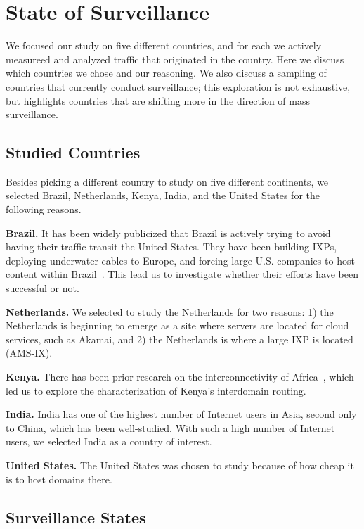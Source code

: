 \section{State of Surveillance}
\label{surv}
We focused our study on five different countries, and for each we actively measureed and analyzed traffic that originated in the country.  Here we discuss which countries we chose and our reasoning.  We also discuss a sampling of countries that currently conduct surveillance; this exploration is not exhaustive, but highlights countries that are shifting more in the direction of mass surveillance.  

\subsection{Studied Countries}
Besides picking a different country to study on five different continents, we selected Brazil, Netherlands, Kenya, India, and the United States for the following reasons.

{\bf Brazil.} It has been widely publicized that Brazil is actively trying to avoid having their traffic transit the United States.  They have been building IXPs, deploying underwater cables to Europe, and forcing large U.S. companies to host content within Brazil~\cite{brazil_history, brazil_break_from_US, brazil_conference,
  brazil_conference2, brazil_human_rights, brazil_cable, brazil_us_companies, brazil_IXP1}.  This lead us to investigate whether their efforts have been successful or not.

{\bf Netherlands.}  We selected to study the Netherlands for two reasons: 1) the Netherlands is beginning to emerge as a site where servers are located for cloud services, such as Akamai, and 2) the Netherlands is where a large IXP is located (AMS-IX).  

{\bf Kenya.} There has been prior research on the interconnectivity of Africa~\cite{gupta2014peering, fanou2015diversity}, which led us to explore the characterization of Kenya's interdomain routing.

{\bf India.}  India has one of the highest number of Internet users in Asia, second only to China, which has been well-studied.  With such a high number of Internet users, we selected India as a country of interest.

{\bf United States.}  The United States was chosen to study because of how cheap it is to host domains there.

\subsection{Surveillance States}

